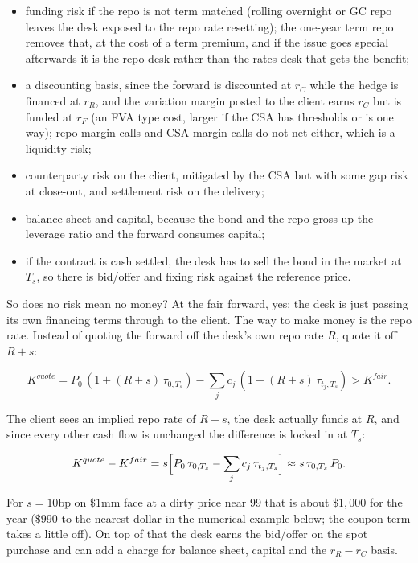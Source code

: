 \documentclass[11pt]{article}
\begin{document}
\begin{itemize}
\item funding risk if the repo is not term matched (rolling overnight or GC repo leaves the desk exposed to the repo rate resetting); the one-year term repo removes that, at the cost of a term premium, and if the issue goes special afterwards it is the repo desk rather than the rates desk that gets the benefit;
\item a discounting basis, since the forward is discounted at $r_C$ while the hedge is financed at $r_R$, and the variation margin posted to the client earns $r_C$ but is funded at $r_F$ (an FVA type cost, larger if the CSA has thresholds or is one way); repo margin calls and CSA margin calls do not net either, which is a liquidity risk;
\item counterparty risk on the client, mitigated by the CSA but with some gap risk at close-out, and settlement risk on the delivery;
\item balance sheet and capital, because the bond and the repo gross up the leverage ratio and the forward consumes capital;
\item if the contract is cash settled, the desk has to sell the bond in the market at $T_s$, so there is bid/offer and fixing risk against the reference price.
\end{itemize}

So does no risk mean no money? At the fair forward, yes: the desk is just passing its own financing terms through to the client. The way to make money is the repo rate. Instead of quoting the forward off the desk's own repo rate $R$, quote it off $R + s$:

\[K^{quote} = P_0\,(1 + (R+s)\,\tau_{0,T_s}) - \sum_j c_j\,(1 + (R+s)\,\tau_{t_j,T_s}) > K^{fair}.\]

The client sees an implied repo rate of $R + s$, the desk actually funds at $R$, and since every other cash flow is unchanged the difference is locked in at $T_s$:

\[K^{quote} - K^{fair} = s\Bigl[P_0\,\tau_{0,T_s} - \sum_j c_j\,\tau_{t_j,T_s}\Bigr] \approx s\,\tau_{0,T_s}\,P_0.\]

For $s = 10$bp on $\$1$mm face at a dirty price near 99 that is about $\$1{,}000$ for the year ($\$990$ to the nearest dollar in the numerical example below; the coupon term takes a little off). On top of that the desk earns the bid/offer on the spot purchase and can add a charge for balance sheet, capital and the $r_R - r_C$ basis.
\end{document}
